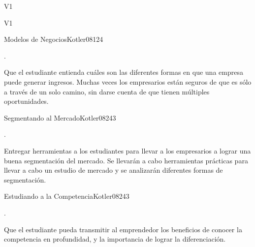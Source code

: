 \begin{syllabus}
\begin{outcomes}{V1}
    \item {}
    \item {}
\end{outcomes}

\begin{competences}{V1}
    \item {}
\end{competences}

\begin{unit}{Modelos de Negocios}{}{Kotler08}{12}{4}
   \begin{topics}
      \item .
   \end{topics}

   \begin{learningoutcomes}
      \item Que el estudiante entienda cuáles son las diferentes formas en que una empresa puede generar ingresos. Muchas veces los empresarios están seguros de que es sólo a través de un solo camino, sin darse cuenta de que tienen múltiples oportunidades.
   \end{learningoutcomes}

\end{unit}

\begin{unit}{Segmentando al Mercado}{}{Kotler08}{24}{3}
   \begin{topics}
      \item .
   \end{topics}

   \begin{learningoutcomes}
      \item Entregar herramientas a los estudiantes para llevar a los empresarios a lograr una buena segmentación del mercado. Se llevarán a cabo herramientas prácticas para llevar a cabo un estudio de mercado y se analizarán diferentes formas de segmentación.
   \end{learningoutcomes}

\end{unit}

\begin{unit}{Estudiando a la Competencia}{}{Kotler08}{24}{3}
   \begin{topics}
      \item .
   \end{topics}

   \begin{learningoutcomes}
      \item Que el estudiante pueda transmitir al emprendedor los beneficios de conocer la competencia en profundidad, y la importancia de lograr la diferenciación.
   \end{learningoutcomes}


\end{unit}
\end{syllabus}
